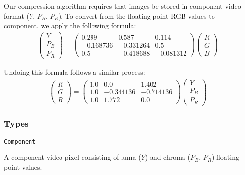 \documentclass[12pt, letterpaper]{article}
\begin{document}
    Our compression algorithm requires that images be stored in component video format ($Y$, $P_B$, $P_R$).
    To convert from the floating-point RGB values to component, we apply the following formula:
    \begin{align*}
        \begin{pmatrix}
            Y   \\
            P_B \\
            P_R
        \end{pmatrix}
        =
        \begin{pmatrix}
            0.299     & 0.587     & 0.114     \\
            -0.168736 & -0.331264 & 0.5       \\
            0.5       & -0.418688 & -0.081312
        \end{pmatrix}
        \begin{pmatrix}
            R \\
            G \\
            B
        \end{pmatrix}
    \end{align*}

    Undoing this formula follows a similar process:
    \begin{align*}
        \begin{pmatrix}
            R \\
            G \\
            B
        \end{pmatrix}
        =
        \begin{pmatrix}
            1.0 & 0.0       & 1.402     \\
            1.0 & -0.344136 & -0.714136 \\
            1.0 & 1.772     & 0.0
        \end{pmatrix}
        \begin{pmatrix}
            Y   \\
            P_B \\
            P_R
        \end{pmatrix}
    \end{align*}

    \subsubsection{Types}

    \verb|Component|

    A component video pixel consisting of luma ($Y$) and chroma ($P_B$, $P_R$) floating-point values.
\end{document}
